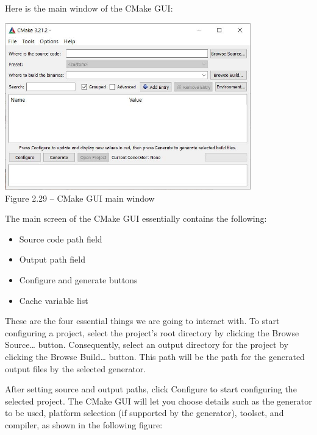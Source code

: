Here is the main window of the CMake GUI:

\begin{center}
\includegraphics[width=0.8\textwidth]{content/1/chapter2/images/29.jpg}\\
Figure 2.29 – CMake GUI main window
\end{center}

The main screen of the CMake GUI essentially contains the following:

\begin{itemize}
\item 
Source code path field

\item 
Output path field

\item 
Configure and generate buttons

\item 
Cache variable list
\end{itemize}

These are the four essential things we are going to interact with. To start configuring a project, select the project's root directory by clicking the Browse Source… button. Consequently, select an output directory for the project by clicking the Browse Build… button. This path will be the path for the generated output files by the selected generator.

After setting source and output paths, click Configure to start configuring the selected project. The CMake GUI will let you choose details such as the generator to be used, platform selection (if supported by the generator), toolset, and compiler, as shown in the following figure:

